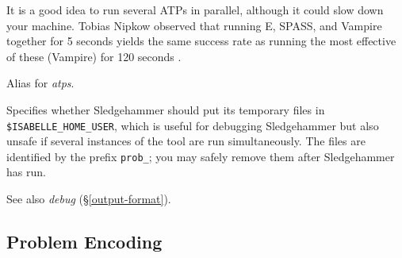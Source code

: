 \documentclass[a4paper,12pt]{article}
\begin{document}
\begin{enum}
It is a good idea to run several ATPs in parallel, although it could slow down
your machine. Tobias Nipkow observed that running E, SPASS, and Vampire together
for 5 seconds yields the same success rate as running the most effective of
these (Vampire) for 120 seconds \cite{boehme-nipkow-2010}.

Alias for \textit{atps}.

Specifies whether Sledgehammer should put its temporary files in
\texttt{\$ISA\-BELLE\_\allowbreak HOME\_\allowbreak USER}, which is useful for
debugging Sledgehammer but also unsafe if several instances of the tool are run
simultaneously. The files are identified by the prefix \texttt{prob\_}; you may
safely remove them after Sledgehammer has run.

\nopagebreak
{\small See also \textit{debug} (\S\ref{output-format}).}
\end{enum}

\subsection{Problem Encoding}
\label{problem-encoding}
\end{document}
